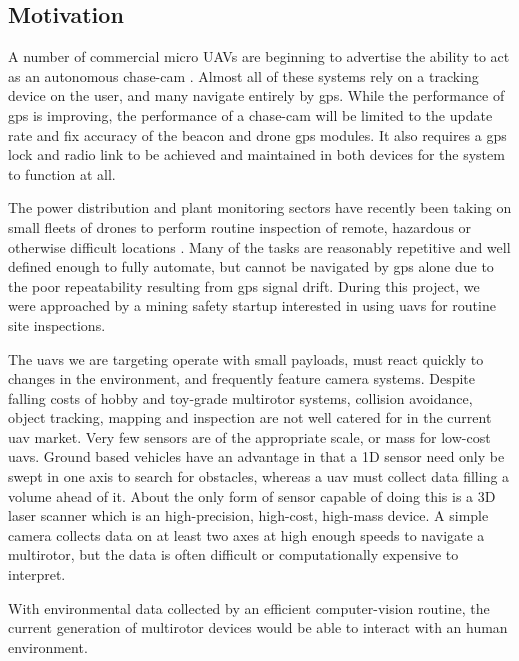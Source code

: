 \documentclass[a4paper, 11pt, titlepage]{article}
\begin{document}
    \subsection{Motivation}

      A number of commercial micro UAVs are beginning to advertise the ability to act as an autonomous chase-cam \cite{Lily} \cite{AirDog}.  Almost all of these systems rely on a tracking device on the user, and many navigate entirely by \gls{gps}.  While the performance of \gls{gps} is improving, the performance of a chase-cam will be limited to the update rate and fix accuracy of the beacon and drone \gls{gps} modules.  It also requires a \gls{gps} lock and radio link to be achieved and maintained in both devices for the system to function at all.

      The power distribution and plant monitoring sectors have recently been taking on small fleets of drones to perform routine inspection of remote, hazardous or otherwise difficult locations \cite{RopeAccess}.  Many of the tasks are reasonably repetitive and well defined enough to fully automate, but cannot be navigated by \gls{gps} alone due to the poor repeatability resulting from \gls{gps} signal drift.
      During this project, we were approached by a mining safety startup interested in using \glspl{uav} for routine site inspections.

      The \glspl{uav} we are targeting operate with small payloads, must react quickly to changes in the environment, and frequently feature camera systems.
      Despite falling costs of hobby and toy-grade multirotor systems, collision avoidance, object tracking, mapping and inspection are not well catered for in the current \gls{uav} market.
      Very few sensors are of the appropriate scale, or mass for low-cost \glspl{uav}.
      Ground based vehicles have an advantage in that a 1D sensor need only be swept in one axis to search for obstacles, whereas a \gls{uav} must collect data filling a volume ahead of it. About the only form of sensor capable of doing this is a 3D laser scanner which is an high-precision, high-cost, high-mass device.
      A simple camera collects data on at least two axes at high enough speeds to navigate a multirotor, but the data is often difficult or computationally expensive to interpret.

      With environmental data collected by an efficient computer-vision routine, the current generation of multirotor devices would be able to interact with an human environment.
\end{document}
